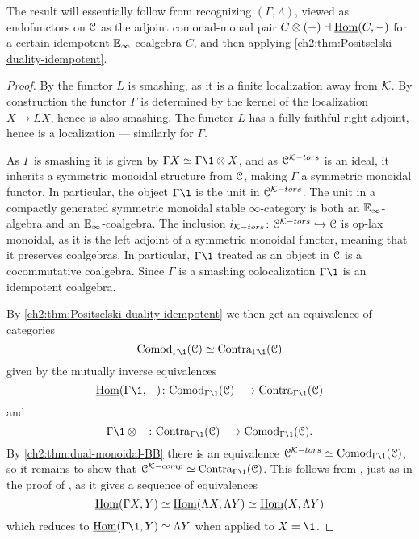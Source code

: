 \begin{remark}
    The result will essentially follow from recognizing $(\Gamma, \Lambda)$, viewed as endofunctors on $\EuScript{C}$ as the adjoint comonad-monad pair $C\otimes (-)\dashv \operatorname{\underline{Hom}}(C,-)$ for a certain idempotent $\mathbb{E}_\infty$-coalgebra $C$, and then applying \cref{ch2:thm:Positselski-duality-idempotent}. 
\end{remark}

\begin{proof}
    By \cite[3.3.3]{hovey-palmiery-strickland_97} the functor $L$ is smashing, as it is a finite localization away from $\mathcal{K}$. By construction the functor $\Gamma$ is determined by the kernel of the localization $X\to LX$, hence is also smashing. The functor $L$ has a fully faithful right adjoint, hence is a localization --- similarly for $\Gamma$. 

    As $\Gamma$ is smashing it is given by $\Gamma X \simeq \Gamma \1 \otimes X$, and as $\EuScript{C}^{\mathcal{K}-tors}$ is an ideal, it inherits a symmetric monoidal structure from $\EuScript{C}$, making $\Gamma$ a symmetric monoidal functor. In particular, the object $\Gamma \1$ is the unit in $\EuScript{C}^{\mathcal{K}-tors}$. The unit in a compactly generated symmetric monoidal stable $\infty$-category is both an $\mathbb{E}_\infty$-algebra and an $\mathbb{E}_\infty$-coalgebra. The inclusion $i_{\mathcal{K}-tors}\colon \EuScript{C}^{\mathcal{K}-tors}\hookrightarrow \EuScript{C}$ is op-lax monoidal, as it is the left adjoint of a symmetric monoidal functor, meaning that it preserves coalgebras. In particular, $\Gamma\1$ treated as an object in $\EuScript{C}$ is a cocommutative coalgebra. Since $\Gamma$ is a smashing colocalization $\Gamma \1$ is an idempotent coalgebra. 

    By \cref{ch2:thm:Positselski-duality-idempotent} we then get an equivalence of categories 
    \[\Comod_{\Gamma \1}(\C) \simeq \Contra_{\Gamma \1}(\C)\]
    given by the mutually inverse equivalences 
    \[\iHom(\Gamma \1,-)\: \Comod_{\Gamma\1}(\C) \to \Contra_{\Gamma \1}(\C)\] 
    and 
    \[\Gamma \1\otimes -\: \Contra_{\Gamma\1}(\C) \to \Comod_{\Gamma \1}(\C).\]
    By \cref{ch2:thm:dual-monoidal-BB} there is an equivalence $\C^{\K-tors}\simeq \Comod_{\Gamma\1}(\C)$, so it remains to show that $\C^{\K-comp}\simeq \Contra_{\Gamma \1}(\C)$. This follows from \cite[2.2]{barthel-heard-valenzuela_2018}, just as in the proof of \cite[2.21(4)]{barthel-heard-valenzuela_2018}, as it gives a sequence of equivalences 
    \[\operatorname{\underline{Hom}}(\Gamma X, Y) \simeq \operatorname{\underline{Hom}}(\Lambda X, \Lambda Y)\simeq \operatorname{\underline{Hom}}(X, \Lambda Y)\]
    which reduces to $\iHom(\Gamma \1, Y) \simeq \Lambda Y$ when applied to $X=\1$. 
\end{proof}

